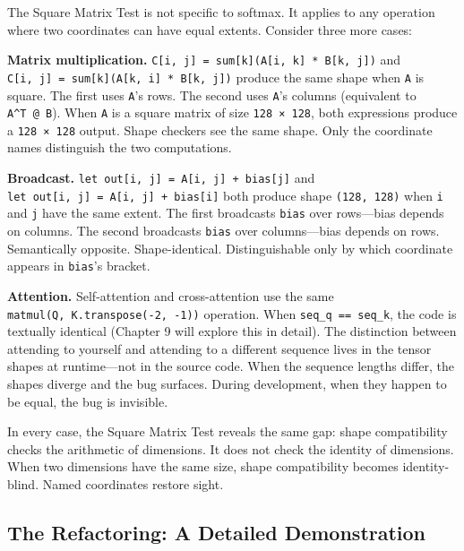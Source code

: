 \documentclass[11pt,titlepage]{article}
\begin{document}
The Square Matrix Test is not specific to softmax. It applies to any
operation where two coordinates can have equal extents. Consider three
more cases:

\textbf{Matrix multiplication.}
\texttt{C{[}i,\ j{]}\ =\ sum{[}k{]}(A{[}i,\ k{]}\ *\ B{[}k,\ j{]})} and
\texttt{C{[}i,\ j{]}\ =\ sum{[}k{]}(A{[}k,\ i{]}\ *\ B{[}k,\ j{]})}
produce the same shape when \texttt{A} is square. The first uses
\texttt{A}'s rows. The second uses \texttt{A}'s columns (equivalent to
\texttt{A\^{}T\ @\ B}). When \texttt{A} is a square matrix of size
\texttt{128\ ×\ 128}, both expressions produce a \texttt{128\ ×\ 128}
output. Shape checkers see the same shape. Only the coordinate names
distinguish the two computations.

\textbf{Broadcast.}
\texttt{let\ out{[}i,\ j{]}\ =\ A{[}i,\ j{]}\ +\ bias{[}j{]}} and
\texttt{let\ out{[}i,\ j{]}\ =\ A{[}i,\ j{]}\ +\ bias{[}i{]}} both
produce shape \texttt{(128,\ 128)} when \texttt{i} and \texttt{j} have
the same extent. The first broadcasts \texttt{bias} over rows---bias
depends on columns. The second broadcasts \texttt{bias} over
columns---bias depends on rows. Semantically opposite. Shape-identical.
Distinguishable only by which coordinate appears in \texttt{bias}'s
bracket.

\textbf{Attention.} Self-attention and cross-attention use the same
\texttt{matmul(Q,\ K.transpose(-2,\ -1))} operation. When
\texttt{seq\_q\ ==\ seq\_k}, the code is textually identical (Chapter 9
will explore this in detail). The distinction between attending to
yourself and attending to a different sequence lives in the tensor
shapes at runtime---not in the source code. When the sequence lengths
differ, the shapes diverge and the bug surfaces. During development,
when they happen to be equal, the bug is invisible.

In every case, the Square Matrix Test reveals the same gap: shape
compatibility checks the arithmetic of dimensions. It does not check the
identity of dimensions. When two dimensions have the same size, shape
compatibility becomes identity-blind. Named coordinates restore sight.

\vspace{2em}

\hypertarget{the-refactoring-a-detailed-demonstration}{%
\subsection{The Refactoring: A Detailed
Demonstration}\label{the-refactoring-a-detailed-demonstration}}
\end{document}
